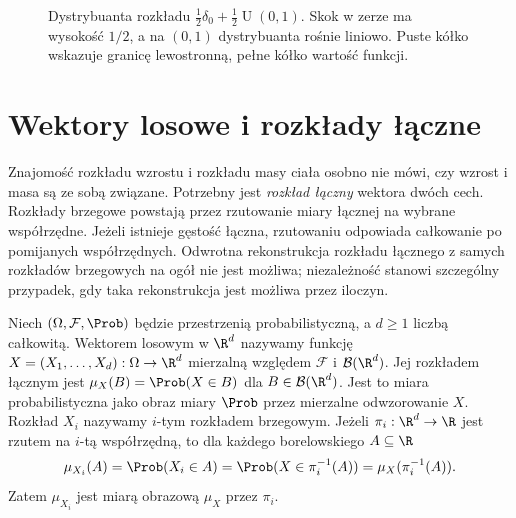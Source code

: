 \begin{figure}[htbp]
\centering
{}
\caption{Dystrybuanta rozkładu $\frac12\delta_0+\frac12\operatorname{U}(0,1)$.
Skok w zerze ma wysokość $1/2$, a na $(0,1)$
dystrybuanta rośnie liniowo. Puste kółko wskazuje
granicę lewostronną, pełne kółko wartość funkcji.}
\label{fig:rp1-04-mixed-cdf}
\end{figure}


\section{Wektory losowe i rozkłady łączne}
Znajomość rozkładu wzrostu i rozkładu masy ciała osobno nie
mówi, czy wzrost i masa są ze sobą związane. Potrzebny jest
\emph{rozkład łączny} wektora dwóch cech. Rozkłady brzegowe
powstają przez rzutowanie miary łącznej na wybrane współrzędne.
Jeżeli istnieje gęstość łączna, rzutowaniu odpowiada
całkowanie po pomijanych współrzędnych. Odwrotna
rekonstrukcja rozkładu łącznego z samych rozkładów brzegowych
na ogół nie jest możliwa; niezależność stanowi szczególny
przypadek, gdy taka rekonstrukcja jest możliwa przez iloczyn.

\begin{definicja}
Niech $(\Omega,\mathcal F,\Prob)$ będzie przestrzenią probabilistyczną,
a $d\geq1$ liczbą całkowitą. Wektorem losowym w $\R^d$ nazywamy funkcję
$X=(X_1,\ldots,X_d):\Omega\to\R^d$ mierzalną względem
$\mathcal F$ i $\mathcal B(\R^d)$. Jej rozkładem łącznym jest
$\mu_X(B)=\Prob(X\in B)$ dla $B\in\mathcal B(\R^d)$.
Jest to miara probabilistyczna jako obraz miary $\Prob$
przez mierzalne odwzorowanie $X$.
Rozkład $X_i$ nazywamy $i$-tym rozkładem brzegowym.
Jeżeli $\pi_i:\R^d\to\R$ jest rzutem na $i$-tą współrzędną,
to dla każdego borelowskiego $A\subseteq\R$
\[
\mu_{X_i}(A)=\Prob(X_i\in A)
=\Prob(X\in\pi_i^{-1}(A))=\mu_X(\pi_i^{-1}(A)).
\]
Zatem $\mu_{X_i}$ jest miarą obrazową $\mu_X$ przez $\pi_i$.
\end{definicja}

